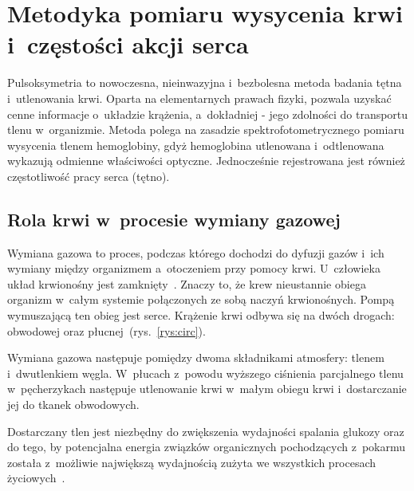 \renewcommand{\figurename}{Rys.}

\chapter{Metodyka pomiaru wysycenia krwi i~częstości akcji serca}
\label{cha:Metodyka}

\fontsize{14}{15}\selectfont

Pulsoksymetria to nowoczesna, nieinwazyjna i~bezbolesna metoda badania tętna i~utlenowania krwi. Oparta na elementarnych prawach fizyki, pozwala 
uzyskać cenne informacje o~układzie krążenia, a~dokładniej - jego zdolności do transportu tlenu w~organizmie. Metoda polega na zasadzie spektrofotometrycznego 
pomiaru wysycenia tlenem hemoglobiny, gdyż hemoglobina utlenowana i~odtlenowana wykazują odmienne właściwości optyczne. Jednocześnie rejestrowana jest również 
częstotliwość pracy serca (tętno).

 
\section{Rola krwi w~procesie wymiany gazowej}
\label{sec:RolaKrwi}

Wymiana gazowa to proces, podczas którego dochodzi do dyfuzji gazów i~ich wymiany między organizmem a~otoczeniem przy pomocy krwi. 
U~człowieka układ krwionośny jest zamknięty~\cite{Fizj:2007}. Znaczy to, że krew nieustannie obiega organizm w~całym systemie połączonych ze sobą 
naczyń krwionośnych. Pompą wymuszającą ten obieg jest serce. Krążenie krwi odbywa się na dwóch drogach: obwodowej oraz płucnej~(rys.~\ref{rys:circ}).

Wymiana gazowa następuje pomiędzy dwoma składnikami atmosfery: tlenem i~dwutlenkiem węgla. W~płucach z~powodu wyższego ciśnienia parcjalnego tlenu 
w~pęcherzykach następuje utlenowanie krwi w~małym obiegu krwi i~dostarczanie jej do tkanek obwodowych.
 
Dostarczany tlen jest niezbędny do zwiększenia wydajności spalania glukozy oraz do tego, by potencjalna energia związków organicznych pochodzących 
z~pokarmu została z~możliwie największą wydajnością zużyta we wszystkich procesach życiowych~\cite{Fizj:2007}.

